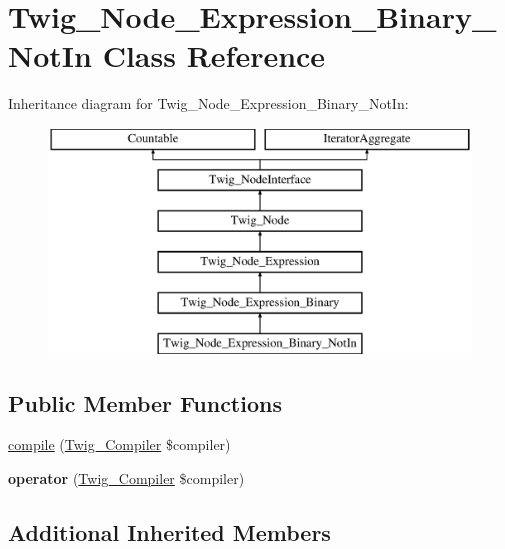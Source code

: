 \hypertarget{class_twig___node___expression___binary___not_in}{}\section{Twig\+\_\+\+Node\+\_\+\+Expression\+\_\+\+Binary\+\_\+\+Not\+In Class Reference}
\label{class_twig___node___expression___binary___not_in}
Inheritance diagram for Twig\+\_\+\+Node\+\_\+\+Expression\+\_\+\+Binary\+\_\+\+Not\+In\+:\begin{figure}[H]
\begin{center}
\leavevmode
\includegraphics[height=6.000000cm]{class_twig___node___expression___binary___not_in}
\end{center}
\end{figure}
\subsection*{Public Member Functions}
\begin{DoxyCompactItemize}
\item 
\hyperlink{class_twig___node___expression___binary___not_in_a4e0faa87c3fae583620b84d3607085da}{compile} (\hyperlink{class_twig___compiler}{Twig\+\_\+\+Compiler} \$compiler)
\item 
\hypertarget{class_twig___node___expression___binary___not_in_af77318ec88d5f8a508684970a150b670}{}{\bfseries operator} (\hyperlink{class_twig___compiler}{Twig\+\_\+\+Compiler} \$compiler)\label{class_twig___node___expression___binary___not_in_af77318ec88d5f8a508684970a150b670}

\end{DoxyCompactItemize}
\subsection*{Additional Inherited Members}


